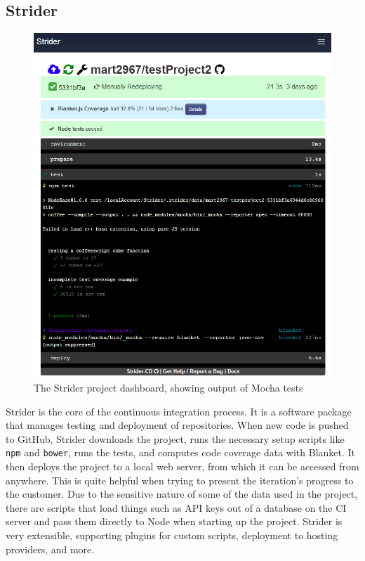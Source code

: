 \documentclass[12pt]{article}
\newcommand{\code}[1]{{\texttt {#1}}}
\begin{document}
\subsection{Strider}\label{sec:strider}
\begin{figure}[h!]
\includegraphics[width=\linewidth]{img/strider_2.png}
\caption{The Strider project dashboard, showing output of Mocha tests}
\end{figure}
Strider\cite{Strider} is the core of the continuous integration process. It is a software package that manages testing and deployment of repositories. When new code is pushed to GitHub, Strider downloads the project, runs the necessary setup scripts like \code{npm} and \code{bower}, runs the tests, and computes code coverage data with Blanket. It then deploys the project to a local web server, from which it can be accessed from anywhere. This is quite helpful when trying to present the iteration's progress to the customer. Due to the sensitive nature of some of the data used in the project, there are scripts that load things such as API keys out of a database on the CI server and pass them directly to Node when starting up the project. Strider is very extensible, supporting plugins for custom scripts, deployment to hosting providers, and more.
\end{document}
